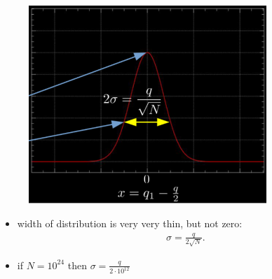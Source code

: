 \documentclass[10pt]{article}
\begin{document}
\begin{figure}[h]
    \centering
    \includegraphics[width=0.8\textwidth]{multiplicityLargeNumbers}
    \caption{}
    \label{fig:multiplicityLargeNumbers}
\end{figure}
\begin{itemize}
    \item width of distribution is very very thin, but not zero:
        \begin{align*}
            \sigma = \frac{q}{2\sqrt{N} }
        .\end{align*}
    \item if $N = 10^{24}$ then $\sigma = \frac{q}{2 \cdot 10^{12}}$
\end{itemize}
\end{document}

